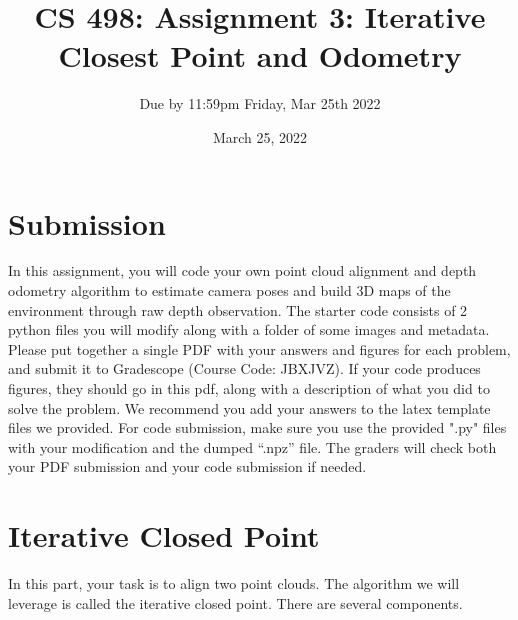 \documentclass[11pt]{article}
\begin{document}




\author{Due by 11:59pm Friday, Mar 25th 2022}
\title{CS 498: Assignment 3: Iterative Closest Point and Odometry}
\date{March 25, 2022}
\maketitle

\medskip


\section*{Submission}
In this assignment, you will code your own point cloud alignment and depth odometry algorithm to estimate camera poses and build 3D maps of the environment through raw depth observation. The starter code consists of 2 python files you will modify along with a folder of some images and metadata. Please put together a single PDF with your answers and figures for each problem, and submit it to Gradescope (Course Code: JBXJVZ). If your code produces figures, they should go in this pdf, along with a description of what you did to solve the problem. We recommend you add your answers to the latex template files we provided. For code submission, make sure you use the provided ".py" files with your modification and the dumped ``.npz'' file. The graders will check both your PDF submission and your code submission if needed. 

\section*{Iterative Closed Point} 

In this part, your task is to align two point clouds. The algorithm we will leverage is called the iterative closed point. There are several components. 
\end{document}
